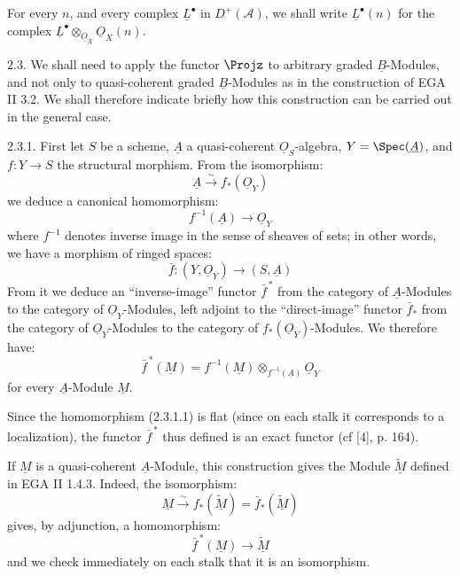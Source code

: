 For every \(n\), and every complex \(\underline{L}^\bullet\) in \(D^+(\mathcal A)\), we shall write \(\underline{L}^\bullet(n)\) for the complex \(\underline{L}^\bullet\otimes_{\underline{O}_X}\underline{O}_X(n)\).

%
2.3.
We shall need to apply the functor \(\Projz\) to arbitrary graded \(\underline{B}\)-Modules, and not only to quasi-coherent graded \(\underline{B}\)-Modules as in the construction of EGA II 3.2. We shall therefore indicate briefly how this construction can be carried out in the general case.

2.3.1. First let \(S\) be a scheme, \(\underline{A}\) a quasi-coherent \(\underline{O}_S\)-algebra, \(Y=\Spec(\underline{A})\), and \(f:Y\to S\) the structural morphism. From the isomorphism:
\[
  \underline{A}\xrightarrow{\sim} f_*(\underline{O}_Y)
\]
we deduce a canonical homomorphism:
\begin{equation}\tag{2.3.1.1}
  f^{-1}(\underline{A})\longrightarrow \underline{O}_Y
\end{equation}
where \(f^{-1}\) denotes inverse image in the sense of sheaves of sets; in other words, we have a morphism of ringed spaces:
\begin{equation}\tag{2.3.1.2}
  \bar f:(Y,\underline{O}_Y)\longrightarrow (S,\underline{A})
\end{equation}
From it we deduce an ``inverse-image'' functor \(\bar f^{\,*}\) from the category of \(\underline{A}\)-Modules to the category of \(\underline{O}_Y\)-Modules, left adjoint to the ``direct-image'' functor \(\bar f_*\) from the category of \(\underline{O}_Y\)-Modules to the category of \(f_*(\underline{O}_Y)\)-Modules. We therefore have:
\begin{equation}\tag{2.3.1.3}
  \bar f^{\,*}(\underline{M})=f^{-1}(\underline{M})\otimes_{f^{-1}(\underline{A})}\underline{O}_Y
\end{equation}
for every \(\underline{A}\)-Module \(\underline{M}\).

Since the homomorphism (2.3.1.1) is flat (since on each stalk it corresponds to a localization), the functor \(\bar f^{\,*}\) thus defined is an exact functor (cf [4], p. 164).

If \(\underline{M}\) is a quasi-coherent \(\underline{A}\)-Module, this construction gives the Module \(\widetilde{\underline{M}}\) defined in EGA II 1.4.3. Indeed, the isomorphism:
%
\[
  \underline{M}\xrightarrow{\sim} f_*(\widetilde{\underline{M}})=\bar f_*(\widetilde{\underline{M}})
\]
gives, by adjunction, a homomorphism:
\[
  \bar f^{\,*}(\underline{M})\longrightarrow \widetilde{\underline{M}}
\]
and we check immediately on each stalk that it is an isomorphism.

